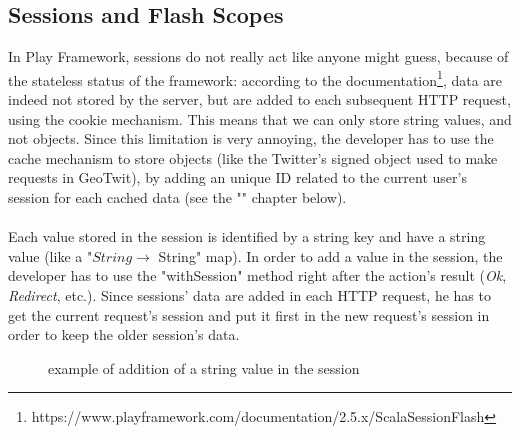 \documentclass[a4paper,11pt]{report}
\begin{document}
\subsection{Sessions and Flash Scopes}
\label{sessionsAndFlashScopes}
In Play Framework, sessions do not really act like anyone might guess, because of the stateless status of the framework: according to the documentation\footnote{https://www.playframework.com/documentation/2.5.x/ScalaSessionFlash}, data are indeed not stored by the server, but are added to each subsequent HTTP request, using the cookie mechanism. This means that we can only store string values, and not objects. Since this limitation is very annoying, the developer has to use the cache mechanism to store objects (like the Twitter's signed object used to make requests in GeoTwit), by adding an unique ID related to the current user's session for each cached data (see the "" chapter below).\\\\
Each value stored in the session is identified by a string key and have a string value (like a "$String\to$ String" map). In order to add a value in the session, the developer has to use the "withSession" method right after the action's result (\emph{Ok}, \emph{Redirect}, etc.). Since sessions' data are added in each HTTP request, he has to get the current request's session and put it first in the new request's session in order to keep the older session's data.
\begin{figure}[H]
\vspace{-5pt}
\begin{center}
\vspace{-5pt}
\caption{example of addition of a string value in the session}
\end{center}
\end{figure}
\vspace{-10pt}
\end{document}
